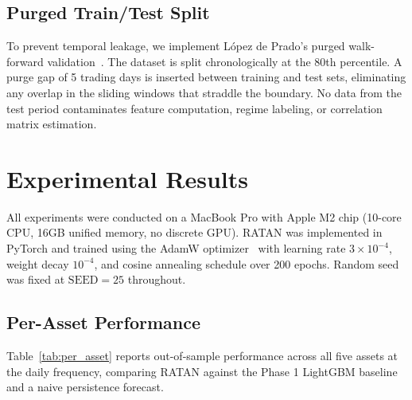 \documentclass[conference]{IEEEtran}
\begin{document}
\subsection{Purged Train/Test Split}

To prevent temporal leakage, we implement L\'{o}pez de Prado's purged walk-forward validation~\cite{lopez2018advances}. The dataset is split chronologically at the 80th percentile. A purge gap of 5 trading days is inserted between training and test sets, eliminating any overlap in the sliding windows that straddle the boundary. No data from the test period contaminates feature computation, regime labeling, or correlation matrix estimation.

\section{Experimental Results}
\label{sec:results}

All experiments were conducted on a MacBook Pro with Apple M2 chip (10-core CPU, 16GB unified memory, no discrete GPU). RATAN was implemented in PyTorch and trained using the AdamW optimizer~\cite{loshchilov2019decoupled} with learning rate $3 \times 10^{-4}$, weight decay $10^{-4}$, and cosine annealing schedule over 200 epochs. Random seed was fixed at $\text{SEED} = 25$ throughout.

\subsection{Per-Asset Performance}

Table~\ref{tab:per_asset} reports out-of-sample performance across all five assets at the daily frequency, comparing RATAN against the Phase 1 LightGBM baseline and a naive persistence forecast.
\end{document}
